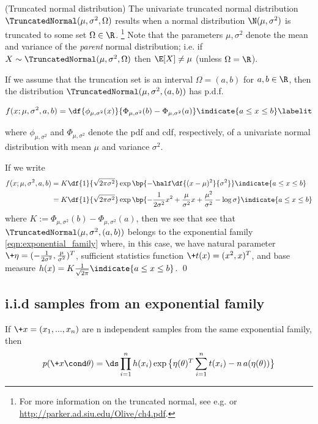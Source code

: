 \documentclass{article} %
\begin{document}
\begin{example}{(Truncated normal distribution)} 
\label{ex:truncated_normal_as_ef} The univariate truncated normal distribution $\TruncatedNormal(\mu,  \sigma^2,  \Omega)$ results when a normal distribution $\N(\mu,  \sigma^2)$ is truncated to some set $\Omega \in \R$. \footnote{For more information on the truncated normal,  see e.g.  \cite{burkardt2014truncated} or \url{http://parker.ad.siu.edu/Olive/ch4.pdf}.}   Note that the parameters $\mu, \sigma^2$ denote the mean and variance of the \textit{parent} normal distribution;  i.e.  if $X \sim \TruncatedNormal(\mu,  \sigma^2,  \Omega)$ then $\E[X] \neq \mu$ (unless $\Omega = \R$). 

If we assume that the truncation set is an interval $\Omega = (a,b)$ for $a,b \in \R$,  then the distribution $\TruncatedNormal(\mu,  \sigma^2,  (a,b))$ has p.d.f.

\begin{align*}
f(x ; \mu,  \sigma^2,  a,  b) = \df{\phi_{\mu, \sigma^2} (x) }{\Phi_{\mu, \sigma^2} (b)  - \Phi_{\mu, \sigma^2} (a) } \indicate{a \leq x \leq b} \labelit \label{eqn:pdf_of_normal_truncated_to_an_interval}
\end{align*} 

where $\phi_{\mu,  \sigma^2}$ and $\Phi_{\mu,  \sigma^2}$ denote the pdf and cdf,  respectively,  of a univariate normal distribution with mean $\mu$ and variance $\sigma^2$.   

If we write
\begin{align*}
f(x ; \mu,  \sigma^2,  a,  b) & = K \df{1}{\sqrt{2 \pi \sigma^2}} \exp \bp{-\half \df{(x-\mu)^2}{\sigma^2}}  \indicate{a \leq x \leq b} \\
& = K \df{1}{\sqrt{2 \pi \sigma^2}} \exp \bp{ - \frac{1}{2 \sigma^2} x^2 + \frac{\mu}{\sigma^2} x  + \frac{\mu^2}{\sigma^2}  - \log \sigma}  \indicate{a \leq x \leq b} 
\end{align*} 
where $K := \Phi_{\mu, \sigma^2} (b)  - \Phi_{\mu, \sigma^2} (a)$,  then we see that see that  $\TruncatedNormal(\mu,  \sigma^2,  (a,b))$ belongs to the exponential family \eqref{eqn:exponential_family} where,  in this case,  we have natural parameter $\+\eta = (- \frac{1}{2 \sigma^2},  \frac{\mu}{\sigma^2})^T$,  sufficient statistics function $\+t(x) = (x^2,  x)^T$,  and base measure $h(x) = K \frac{1}{\sqrt{2 \pi}}  \indicate{a \leq x \leq b}$.
\qed
\end{example}

\subsection{i.i.d samples from an exponential family}
If $\+x=(x_1, ..., x_n)$ are n independent samples from the same exponential family, then 
\begin{align}
\label{eqn:exponential_family_iid}
 p(\+x \cond \theta) = \ds\prod_{i=1}^n h(x_i) \exp \big\{ \eta(\theta)^T \sum_{i=1}^n t(x_i) - n \,a(\eta(\theta))\big\} 
 \end{align}
\end{document}
